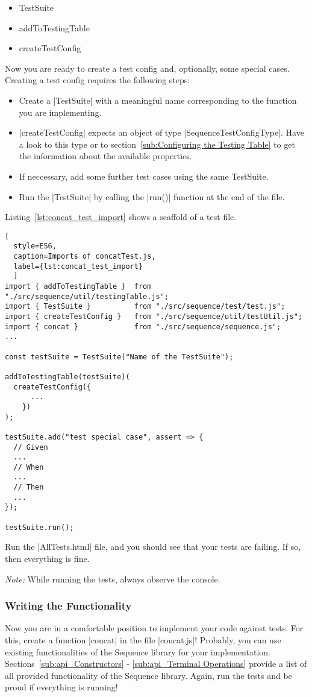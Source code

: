 \begin{itemize}
  \item{TestSuite}
  \item{addToTestingTable}
  \item{createTestConfig}
\end{itemize}
Now you are ready to create a test config and, optionally, some special cases.
Creating a test config requires the following steps:

\begin{itemize}
  \item{Create a |TestSuite| with a meaningful name corresponding to the function you are implementing.}
  \item{|createTestConfig| expects an object of type |SequenceTestConfigType|. Have a look
    to this type or to section~\ref{sub:Configuring the Testing Table} to get the information about the available properties. }
      \item{If neccessary, add some further test cases using the same TestSuite.}
  \item{Run the |TestSuite| by calling the |run()| function at the end of the file. }
\end{itemize}

Listing~\ref{lst:concat_test_import} shows a scaffold of a test file. 

\begin{lstlisting}[
  style=ES6, 
  caption=Imports of concatTest.js,
  label={lst:concat_test_import}
  ]
import { addToTestingTable }  from "./src/sequence/util/testingTable.js";
import { TestSuite }          from "./src/sequence/test/test.js";
import { createTestConfig }   from "./src/sequence/util/testUtil.js";
import { concat }             from "./src/sequence/sequence.js";
...

const testSuite = TestSuite("Name of the TestSuite");

addToTestingTable(testSuite)(
  createTestConfig({
      ...
    })
);

testSuite.add("test special case", assert => {
  // Given
  ...
  // When
  ...
  // Then
  ...
});

testSuite.run();
\end{lstlisting}

Run the |AllTests.html| file, and you should see that your tests are failing.
If so, then everything is fine.

\textit{Note:} While running the tests, always observe the console.

\subsubsection{Writing the Functionality}
\label{subsub:Write the Functionality}
Now you are in a comfortable position to implement your code against tests.
For this, create a function |concat| in the file |concat.js|!
Probably, you can use existing functionalities of the Sequence library for your
implementation. Sections~\ref{sub:api_Constructors} - \ref{sub:api_Terminal
Operations} provide a list of all provided functionality of the Sequence
library.
\newline
Again, run the tests and be proud if everything is running!
